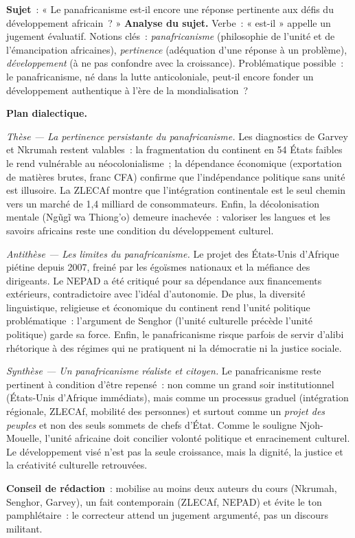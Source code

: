 \documentclass[11pt]{article}
\begin{document}
\begin{exoresolu}
\textbf{Sujet}~: « Le panafricanisme est-il encore une réponse pertinente aux défis du développement africain~? »
\tcblower
\textbf{Analyse du sujet.} Verbe~: « est-il » appelle un jugement évaluatif. Notions clés~: \emph{panafricanisme} (philosophie de l'unité et de l'émancipation africaines), \emph{pertinence} (adéquation d'une réponse à un problème), \emph{développement} (à ne pas confondre avec la croissance). Problématique possible~: le panafricanisme, né dans la lutte anticoloniale, peut-il encore fonder un développement authentique à l'ère de la mondialisation~?

\textbf{Plan dialectique.}

\emph{Thèse --- La pertinence persistante du panafricanisme.} Les diagnostics de Garvey et Nkrumah restent valables~: la fragmentation du continent en 54 États faibles le rend vulnérable au néocolonialisme~; la dépendance économique (exportation de matières brutes, franc CFA) confirme que l'indépendance politique sans unité est illusoire. La ZLECAf montre que l'intégration continentale est le seul chemin vers un marché de 1,4 milliard de consommateurs. Enfin, la décolonisation mentale (Ngũgĩ wa Thiong'o) demeure inachevée~: valoriser les langues et les savoirs africains reste une condition du développement culturel.

\emph{Antithèse --- Les limites du panafricanisme.} Le projet des États-Unis d'Afrique piétine depuis 2007, freiné par les égoïsmes nationaux et la méfiance des dirigeants. Le NEPAD a été critiqué pour sa dépendance aux financements extérieurs, contradictoire avec l'idéal d'autonomie. De plus, la diversité linguistique, religieuse et économique du continent rend l'unité politique problématique~: l'argument de Senghor (l'unité culturelle précède l'unité politique) garde sa force. Enfin, le panafricanisme risque parfois de servir d'alibi rhétorique à des régimes qui ne pratiquent ni la démocratie ni la justice sociale.

\emph{Synthèse --- Un panafricanisme réaliste et citoyen.} Le panafricanisme reste pertinent à condition d'être repensé~: non comme un grand soir institutionnel (États-Unis d'Afrique immédiats), mais comme un processus graduel (intégration régionale, ZLECAf, mobilité des personnes) et surtout comme un \emph{projet des peuples} et non des seuls sommets de chefs d'État. Comme le souligne Njoh-Mouelle, l'unité africaine doit concilier volonté politique et enracinement culturel. Le développement visé n'est pas la seule croissance, mais la dignité, la justice et la créativité culturelle retrouvées.

\textbf{Conseil de rédaction}~: mobilise au moins deux auteurs du cours (Nkrumah, Senghor, Garvey), un fait contemporain (ZLECAf, NEPAD) et évite le ton pamphlétaire~: le correcteur attend un jugement argumenté, pas un discours militant.
\end{exoresolu}
\end{document}

